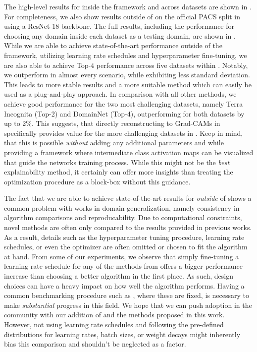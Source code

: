 The high-level results for \divcams inside the \domainbed framework and across datasets are shown in . For completeness, we also show results outside of \domainbed on the official PACS split in  using a ResNet-18 backbone. The full results, including the performance for choosing any domain inside each dataset as a testing domain, are shown in . While we are able to achieve state-of-the-art performance outside of the \domainbed framework, utilizing learning rate schedules and hyperparameter fine-tuning, we are also able to achieve Top-$4$ performance across five datasets within \domainbed. Notably, we outperform \rsc in almost every scenario, while exhibiting less standard deviation. This leads to more stable results and a more suitable method which can easily be used as a plug-and-play approach. In comparison with all other methods, we achieve good performance for the two most challenging datasets, namely Terra Incognita (Top-2) and DomainNet (Top-4), outperforming \rsc for both datasets by up to 2\%. This suggests, that directly reconstructing to Grad-CAMs in \divcams specifically provides value for the more challenging datasets in \domainbed. Keep in mind, that this is possible \emph{without} adding any additional parameters and while providing a framework where intermediate class activation maps can be visualized that guide the networks training process. While this might not be the \emph{best} explainability method, it certainly can offer more insights than  treating the optimization procedure as a block-box without this guidance.

The fact that we are able to achieve state-of-the-art results for \divcams \emph{outside} of \domainbed shows a common problem with works in domain generalization, namely consistency in algorithm comparisons and reproducability. Due to computational constraints, novel methods are often only compared to the results provided in previous works. As a result, details such as the hyperparameter tuning procedure, learning rate schedules, or even the optimizer are often omitted or chosen to fit the algorithm at hand. From some of our experiments, we observe that simply fine-tuning a learning rate schedule for any of the methods from  offers a bigger performance increase than choosing a better algorithm in the first place. As such, design choices can have a heavy impact on how well the algorithm performs. Having a common benchmarking procedure such as \domainbed, where these are fixed, is necessary to make \emph{substantial} progress in this field. We hope that we can push adoption in the community with our addition of \rsc and the methods proposed in this work. However, not using learning rate schedules and following the pre-defined distributions for learning rates, batch sizes, or weight decays might inherently bias this comparison and shouldn't be neglected as a factor.  

